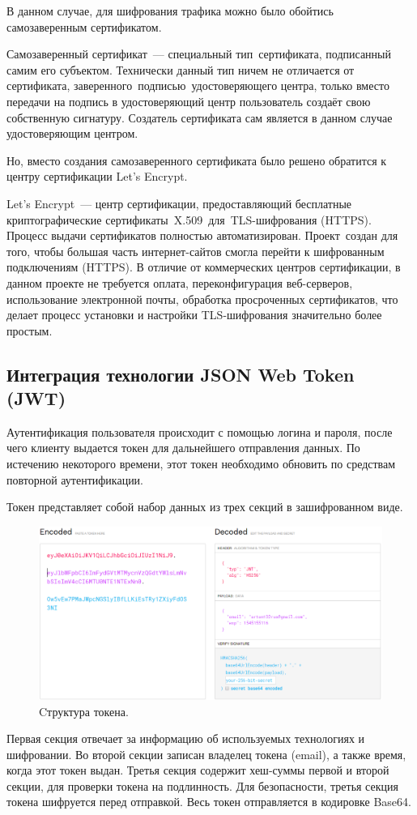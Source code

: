 \documentclass[14pt, a4paper]{extarticle}
\begin{document}
    В данном случае, для шифрования трафика можно было обойтись самозаверенным сертификатом.

    Самозаверенный сертификат — специальный тип сертификата, подписанный самим его субъектом. Технически данный тип ничем не отличается от сертификата, заверенного подписью удостоверяющего центра, только вместо передачи на подпись в удостоверяющий центр пользователь создаёт свою собственную сигнатуру. Создатель сертификата сам является в данном случае удостоверяющим центром.

    Но, вместо создания самозаверенного сертификата было решено обратится к центру сертификации Let’s Encrypt.

    Let’s Encrypt — центр сертификации, предоставляющий бесплатные криптографические сертификаты X.509 для TLS-шифрования (HTTPS). Процесс выдачи сертификатов полностью автоматизирован. Проект создан для того, чтобы большая часть интернет-сайтов смогла перейти к шифрованным подключениям (HTTPS). В отличие от коммерческих центров сертификации, в данном проекте не требуется оплата, переконфигурация веб-серверов, использование электронной почты, обработка просроченных сертификатов, что делает процесс установки и настройки TLS-шифрования значительно более простым.


    \clearpage
    \subsection{Интеграция технологии JSON Web Token (JWT)}
    Аутентификация пользователя происходит с помощью логина и пароля, после чего клиенту выдается токен для дальнейшего отправления данных. По истечению некоторого времени, этот токен необходимо обновить по средствам повторной аутентификации.

    Токен представляет собой набор данных из трех секций в зашифрованном виде.

    \begin{figure}[h]
        \centering
        \includegraphics[width=1\linewidth]{img/token1.png}
        \caption{Cтруктура токена.}
        \label{fig:token1}
    \end{figure}
    Первая секция отвечает за информацию об используемых технологиях и шифровании. Во второй секции записан владелец токена (email), а также время, когда этот токен выдан. Третья секция содержит хеш-суммы первой и второй секции, для проверки токена на подлинность. Для безопасности, третья секция токена шифруется перед отправкой. Весь токен отправляется в кодировке Base64.
\end{document}

